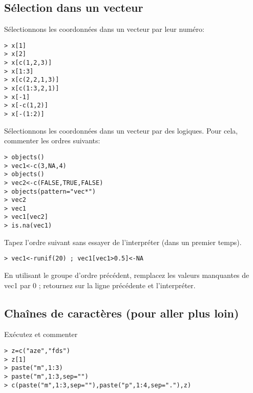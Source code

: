 \documentclass[a4paper,10pt,french]{article}
\begin{document}
\subsection{Sélection dans un vecteur}
Sélectionnons les coordonnées dans un vecteur par leur numéro:
\begin{verbatim}
> x[1]
> x[2]
> x[c(1,2,3)]
> x[1:3]
> x[c(2,2,1,3)]
> x[c(1:3,2,1)]
> x[-1]
> x[-c(1,2)]
> x[-(1:2)]
\end{verbatim}

Sélectionnons les coordonnées dans un vecteur par des logiques. Pour cela, commenter les ordres suivants:
\begin{verbatim}
> objects()
> vec1<-c(3,NA,4)
> objects()
> vec2<-c(FALSE,TRUE,FALSE)
> objects(pattern="vec*")
> vec2
> vec1
> vec1[vec2]
> is.na(vec1)
\end{verbatim}

Tapez l'ordre suivant sans essayer de l'interpréter (dans un premier
temps).
\begin{verbatim}
> vec1<-runif(20) ; vec1[vec1>0.5]<-NA
\end{verbatim}
En utilisant le groupe d'ordre précédent, remplacez les valeurs manquantes
de vec1 par 0 ; retournez sur la ligne précédente et l'interpréter.


\subsection{Chaînes de caractères (pour aller plus loin)}
Exécutez et commenter
\begin{verbatim}
> z=c("aze","fds")
> z[1]
> paste("m",1:3)
> paste("m",1:3,sep="")
> c(paste("m",1:3,sep=""),paste("p",1:4,sep="."),z)
\end{verbatim}
\end{document}
